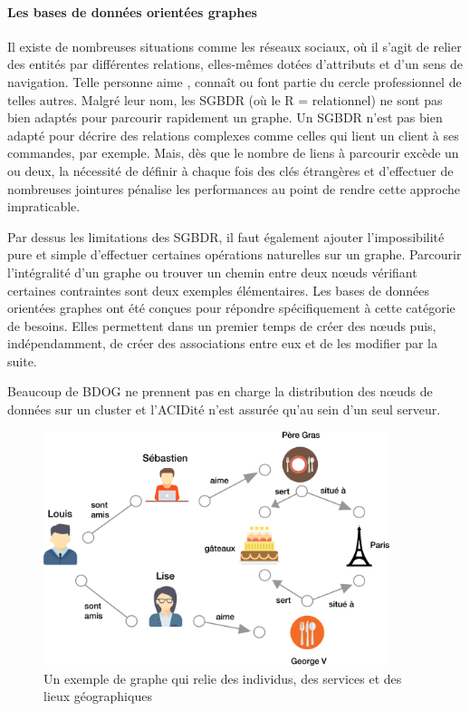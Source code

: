 \documentclass[12pt]{article}
\begin{document}
\paragraph{Les bases de données orientées graphes}
Il existe de nombreuses situations comme les réseaux sociaux, où il s'agit de relier des entités par différentes relations, elles-mêmes dotées d'attributs et d'un sens de navigation. Telle personne \og aime \fg , \og connaît \fg ou \og font partie du cercle professionnel \fg de telles autres. Malgré leur nom, les SGBDR (où le \og R \fg = relationnel) ne sont pas bien adaptés pour parcourir rapidement un graphe. Un SGBDR n'est pas bien adapté pour décrire des relations complexes comme celles qui lient un client à ses commandes, par exemple. Mais, dès que le nombre de liens à parcourir excède un ou deux, la nécessité de définir à chaque fois des clés étrangères et d'effectuer de nombreuses jointures pénalise les performances au point de rendre cette approche impraticable.
\par
Par dessus les limitations des SGBDR, il faut également ajouter l'impossibilité pure et simple d'effectuer certaines opérations naturelles sur un graphe. Parcourir l'intégralité d'un graphe ou trouver un chemin entre deux nœuds vérifiant certaines contraintes sont deux exemples élémentaires. Les bases de données orientées graphes ont été conçues pour répondre spécifiquement à cette catégorie de besoins. Elles permettent dans un premier temps de créer des nœuds puis, indépendamment, de créer des associations entre eux et de les modifier par la suite.\par
Beaucoup de BDOG ne prennent pas en charge la distribution des nœuds de données sur un cluster et l'ACIDité n'est assurée qu'au sein d'un seul serveur. 
\begin{figure}[H]
\centering
\includegraphics[width=0.9\textwidth]{graph}
\caption{Un exemple de graphe qui relie des individus, des services et des lieux géographiques}
\end{figure}
\end{document}
